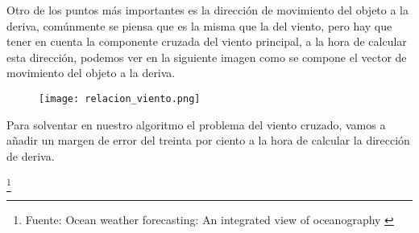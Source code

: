 Otro de los puntos más importantes es la dirección de movimiento del objeto a la deriva, comúnmente se piensa que es la misma que la del viento, pero hay que tener en cuenta la componente cruzada del viento principal, a la hora de calcular esta dirección, podemos ver en la siguiente imagen como se compone el vector de movimiento del objeto a la deriva.


\begin{figure}[h]
\texttt{[image: relacion\_viento.png]} 
\end{figure}


Para solventar en nuestro algoritmo el problema del viento cruzado, vamos a añadir un margen de error del treinta por ciento a la hora de calcular la dirección de deriva. 

\footnote{Fuente: Ocean weather forecasting: An integrated view of oceanography \cite{DDERIVA}}
